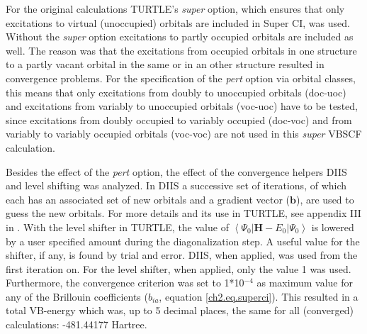 For the original calculations TURTLE's \textit{super} option, which ensures that only excitations to virtual (unoccupied) orbitals are included in Super CI, was used. Without the \textit{super} option excitations to partly occupied orbitals are included as well. The reason was that the excitations from occupied orbitals in one structure to a partly vacant orbital in the same or in an other structure resulted in convergence problems. For the specification of the \textit{pert} option via orbital classes, this means that only excitations from doubly to unoccupied orbitals \mbox{(doc-uoc)} and excitations from variably to unoccupied orbitals \mbox{(voc-uoc)} have to be tested, since excitations from doubly occupied to variably occupied \mbox{(doc-voc)} and from variably to variably occupied orbitals \mbox{(voc-voc)} are not used in this \textit{super} VBSCF calculation.

Besides the effect of the \textit{pert} option, the effect of the convergence helpers DIIS \cite{diis1,diis2} and level shifting \cite{level1,level2} was analyzed. In DIIS a successive set of iterations, of which each has an associated set of new orbitals and a gradient vector ($\mathbf{b}$), are used to guess the new orbitals. For more details and its use in TURTLE, see appendix III in \cite{koos1}. With the level shifter in TURTLE, the value of $\left < \Psi_0 | \mathbf{H} - E_0 | \Psi_0 \right >$ is lowered by a user specified amount during the diagonalization step. A useful value for the shifter, if any, is found by trial and error. DIIS, when applied, was used from the first iteration on. For the level shifter, when applied, only the value 1 was used. Furthermore, the convergence criterion was set to 1*10$^{-4}$ as maximum value for any of the Brillouin coefficients ($b_{ia}$, equation \ref{ch2.eq.superci}). This resulted in a total VB-energy which was, up to 5 decimal places, the same for all (converged) calculations: -481.44177 Hartree.


